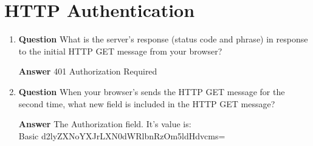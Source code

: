 \documentclass[12pt,letterpaper]{article}
\newcommand{\q}{\textbf{Question} }
\newcommand{\ans}{\textbf{Answer} }
\begin{document}
\pagebreak
\pagebreak
\pagebreak


\section{HTTP Authentication}
\begin{enumerate}[resume]
\item \q What is the server’s response (status code and phrase) in response to
    the initial HTTP GET message from your browser? 

\ans 401 Authorization Required

\item \q When your browser’s sends the HTTP GET message for the second time,
    what new field is included in the HTTP GET message? 

\ans The Authorization field. It's value is: \\
    Basic d2lyZXNoYXJrLXN0dWRlbnRzOm5ldHdvcms=
\end{enumerate}

\pagebreak
\pagebreak 
\pagebreak
\end{document}
